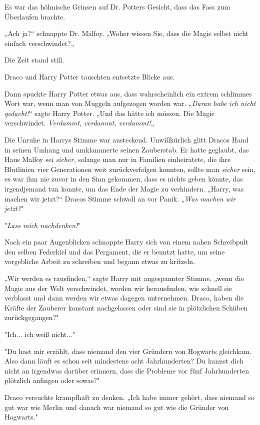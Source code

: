 {Es war das höhnische Grinsen auf Dr. Potters Gesicht, dass das Fass zum Überlaufen brachte.

„Ach ja?“ schnappte Dr. Malfoy. „Woher wissen Sie, dass die Magie selbst nicht einfach verschwindet?„

Die Zeit stand still.

Draco und Harry Potter tauschten entsetzte Blicke aus.

Dann spuckte Harry Potter etwas aus, dass wahrscheinlich ein extrem schlimmes Wort war, wenn man von Muggeln aufgezogen worden war. „\emph{Daran habe ich nicht gedacht!}“ sagte Harry Potter. „Und das hätte ich müssen. Die Magie verschwindet. \emph{Verdammt, verdammt, verdammt!}„

Die Unruhe in Harrys Stimme war ansteckend. Unwillkürlich glitt Dracos Hand in seinen Umhang und umklammerte seinen Zauberstab. Er hatte geglaubt, das Haus Malfoy sei \emph{sicher,} solange man nur in Familien einheiratete, die ihre Blutlinien vier Generationen weit zurückverfolgen konnten, sollte man \emph{sicher} sein, es war ihm nie zuvor in den Sinn gekommen, dass es nichts geben könnte, das irgendjemand tun konnte, um das Ende der Magie zu verhindern. „Harry, was machen wir jetzt?“ Dracos Stimme schwoll an vor Panik. „\emph{Was machen wir jetzt?}"

"\emph{Lass mich nachdenken!}"

Nach ein paar Augenblicken schnappte Harry sich von einem nahen Schreibpult den selben Federkiel und das Pergament, die er benutzt hatte, um seine vorgebliche Arbeit zu schreiben und begann etwas zu kritzeln.

„Wir werden es rausfinden,“ sagte Harry mit angespannter Stimme, „wenn die Magie aus der Welt verschwindet, werden wir herausfinden, wie schnell sie verblasst und dann werden wir etwas dagegen unternehmen. Draco, haben die Kräfte der Zauberer konstant nachgelassen oder sind sie in plötzlichen Schüben zurückgegangen?"

"Ich... ich weiß nicht..."

"Du hast mir erzählt, dass niemand den vier Gründern von Hogwarts gleichkam. Also dann läuft es schon seit mindestens acht Jahrhunderten? Du kannst dich nicht an irgendwas darüber erinnern, dass die Probleme vor fünf Jahrhunderten plötzlich anfingen oder sowas?"

Draco versuchte krampfhaft zu denken. „Ich habe immer gehört, dass niemand so gut war wie Merlin und danach war niemand so gut wie die Gründer von Hogwarts."

}
